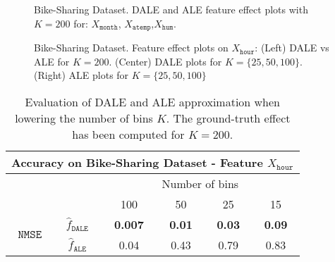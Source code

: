 \documentclass[wcp]{jmlr}
\newcommand{\dale}{\hat{f}_{\mathtt{DALE}}}
\newcommand{\alep}{\hat{f}_{\mathtt{ALE}}}
\begin{document}
\begin{figure}[h]
  \centering
  \resizebox{.3\columnwidth}{!}{}
  \resizebox{.3\columnwidth}{!}{}
  \resizebox{.3\columnwidth}{!}{}
  \caption{Bike-Sharing Dataset. DALE and ALE feature effect plots with \(K=200\) for:
    \(X_{\texttt{month}}\), \(X_{\mathtt{atemp}}\),\(X_{\mathtt{hum}}\).}
  \label{fig:bike-sharing-comparison}
\end{figure}


\begin{figure}[h]
  \centering
    \resizebox{.3\columnwidth}{!}{}
    \resizebox{.3\columnwidth}{!}{}
    \resizebox{.3\columnwidth}{!}{}
    \caption{Bike-Sharing Dataset. Feature effect plots on \(X_{\texttt{hour}}\): (Left)
      DALE vs ALE for \(K=200\). (Center) DALE plots for
      \(K = \{25, 50, 100\}\). (Right) ALE plots for
      \(K = \{25, 50, 100\}\)}
  \label{fig:bike-sharing-feature-3}
\end{figure}


\begin{table}
  \caption{Evaluation of DALE and ALE approximation when lowering the
    number of bins \(K\). The ground-truth effect has been computed
    for \(K=200\).}
  \label{tab:bike-sharing-accuracy}
  \centering
  \begin{tabular}{c|c|c|c|c|c}
    \multicolumn{6}{c}{Accuracy on Bike-Sharing Dataset - Feature \(X_{\mathtt{hour}}\)} \\
    \hline \hline
    & & \multicolumn{4}{|c}{Number of bins} \\
    \hline
    & & 100 & 50 & 25 & 15 \\
    \hline
    \hline
    \multirow{2}{*}{\(\mathtt{NMSE}\)} & \(\dale\) & \textbf{0.007} & \textbf{0.01} & \textbf{0.03} & \textbf{0.09} \\
    & \(\alep\) & 0.04 & 0.43 & 0.79 & 0.83 \\
    \hline
  \end{tabular}
\end{table}
\end{document}
